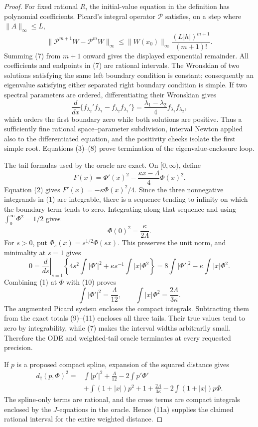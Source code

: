 \documentclass{article}
\begin{document}
{\begin{proof}
For fixed rational \(R\), the initial-value equation in the definition has polynomial coefficients.  Picard's integral operator \(\mathcal P\) satisfies, on a step where \(\|A\|_\infty\le L\),
\[
\|\mathcal P^{m+1}W-\mathcal P^mW\|_\infty
\le \|W(x_0)\|_\infty
\frac{(L|h|)^{m+1}}{(m+1)!}. \tag{7}
\]
Summing (7) from \(m+1\) onward gives the displayed exponential remainder.  All coefficients and endpoints in (7) are rational intervals.  The Wronskian of two solutions satisfying the same left boundary condition is constant; consequently an eigenvalue satisfying either separated right boundary condition is simple.  If two spectral parameters are ordered, differentiating their Wronskian gives
\[
\frac{d}{dx}\{f_{\lambda_2}'f_{\lambda_1}
-f_{\lambda_2}f_{\lambda_1}'\}
=\frac{\lambda_1-\lambda_2}{4}f_{\lambda_1}f_{\lambda_2}, \tag{8}
\]
which orders the first boundary zero while both solutions are positive.  Thus a sufficiently fine rational space--parameter subdivision, interval Newton applied also to the differentiated equation, and the positivity checks isolate the first simple root.  Equations (3)--(8) prove termination of the eigenvalue-enclosure loop.

The tail formulas used by the oracle are exact.  On \([0,\infty)\), define
\[
F(x)=\Phi'(x)^2-\frac{\kappa x-\Lambda}{4}\Phi(x)^2.
\]
Equation (2) gives \(F'(x)=-\kappa\Phi(x)^2/4\).  Since the three nonnegative integrands in (1) are integrable, there is a sequence tending to infinity on which the boundary term tends to zero.  Integrating along that sequence and using \(\int_0^\infty\Phi^2=1/2\) gives
\[
\Phi(0)^2=\frac{\kappa}{2\Lambda}. \tag{9}
\]
For \(s>0\), put \(\Phi_s(x)=s^{1/2}\Phi(sx)\).  This preserves the unit norm, and minimality at \(s=1\) gives
\[
0=\left.\frac d{ds}\right|_{s=1}
\left\{4s^2\int|\Phi'|^2+
\kappa s^{-1}\int|x|\Phi^2\right\}
=8\int|\Phi'|^2-
\kappa\int|x|\Phi^2. \tag{10}
\]
Combining (1) at \(\Phi\) with (10) proves
\[
\int|\Phi'|^2=\frac{\Lambda}{12},
\qquad
\int|x|\Phi^2=\frac{2\Lambda}{3\kappa}. \tag{11}
\]
The augmented Picard system encloses the compact integrals.  Subtracting them from the exact totals (9)--(11) encloses all three tails.  Their true values tend to zero by integrability, while (7) makes the interval widths arbitrarily small.  Therefore the ODE and weighted-tail oracle terminates at every requested precision.

If \(p\) is a proposed compact spline, expansion of the squared distance gives
\[
\begin{aligned}
d_\dagger(p,\Phi)^2
={}&\int|p'|^2+\frac{\Lambda}{12}
-2\int p'\Phi'\\
&+\int(1+|x|)p^2
+1+\frac{2\Lambda}{3\kappa}
-2\int(1+|x|)p\Phi .
\end{aligned} \tag{11a}
\]
The spline-only terms are rational, and the cross terms are compact integrals enclosed by the \(J\)-equations in the oracle.  Hence (11a) supplies the claimed rational interval for the entire weighted distance.


\end{proof}}
\end{document}
